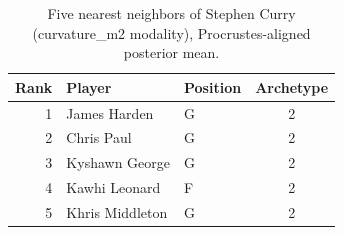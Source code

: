 \begin{table}[htbp]
  \centering\small
  \begin{tabular}{rllc}
    \toprule
    Rank & Player & Position & Archetype \\
    \midrule
    1 & James Harden & G & 2 \\
    2 & Chris Paul & G & 2 \\
    3 & Kyshawn George & G & 2 \\
    4 & Kawhi Leonard & F & 2 \\
    5 & Khris Middleton & G & 2 \\
    \bottomrule
  \end{tabular}
  \caption{Five nearest neighbors of Stephen Curry (curvature_m2 modality), Procrustes-aligned posterior mean.}
  \label{tab:Stephen_Curry_neighbors_curvature_m2}
\end{table}

